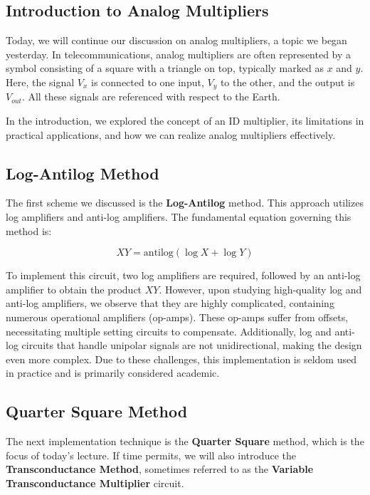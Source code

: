 \documentclass[a4paper,9pt,twoside,openany,twocolumn]{memoir}
\begin{document}
\subsection{Introduction to Analog Multipliers}

Today, we will continue our discussion on analog multipliers, a topic we began yesterday. In telecommunications, analog multipliers are often represented by a symbol consisting of a square with a triangle on top, typically marked as \( x \) and \( y \). Here, the signal \( V_x \) is connected to one input, \( V_y \) to the other, and the output is \( V_{out} \). All these signals are referenced with respect to the Earth.

In the introduction, we explored the concept of an ID multiplier, its limitations in practical applications, and how we can realize analog multipliers effectively.

\subsection{Log-Antilog Method}

The first scheme we discussed is the \textbf{Log-Antilog} method. This approach utilizes log amplifiers and anti-log amplifiers. The fundamental equation governing this method is:

\[
XY = \text{antilog}(\log X + \log Y)
\]

To implement this circuit, two log amplifiers are required, followed by an anti-log amplifier to obtain the product \( XY \). However, upon studying high-quality log and anti-log amplifiers, we observe that they are highly complicated, containing numerous operational amplifiers (op-amps). These op-amps suffer from offsets, necessitating multiple setting circuits to compensate. Additionally, log and anti-log circuits that handle unipolar signals are not unidirectional, making the design even more complex. Due to these challenges, this implementation is seldom used in practice and is primarily considered academic.

\subsection{Quarter Square Method}

The next implementation technique is the \textbf{Quarter Square} method, which is the focus of today's lecture. If time permits, we will also introduce the \textbf{Transconductance Method}, sometimes referred to as the \textbf{Variable Transconductance Multiplier} circuit.
\end{document}
